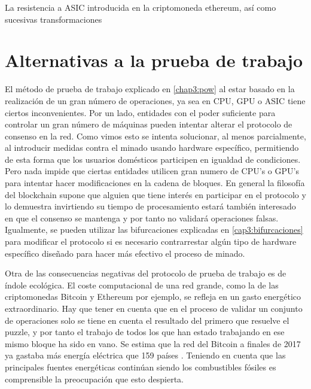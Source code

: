 La resistencia a ASIC introducida en la criptomoneda ethereum, así como sucesivas transformaciones 

\section{Alternativas a la prueba de trabajo}
El método de prueba de trabajo explicado en \ref{chap3:pow} al estar basado en la realización de un gran número de operaciones, ya sea en CPU, GPU o ASIC tiene ciertos inconvenientes. Por un lado, entidades con el poder suficiente para controlar un gran número de máquinas pueden intentar alterar el protocolo de consenso en la red. Como vimos esto se intenta solucionar, al menos parcialmente, al introducir medidas contra el minado usando hardware específico, permitiendo de esta forma que los usuarios domésticos participen en igualdad de condiciones. Pero nada impide que ciertas entidades utilicen gran numero de CPU's o GPU's para intentar hacer modificaciones en la cadena de bloques.
En general la filosofía del blockchain supone que alguien que tiene interés en participar en el protocolo y lo demuestra invirtiendo su tiempo de procesamiento estará también interesado en que el consenso se mantenga y por tanto no validará operaciones falsas. Igualmente, se pueden utilizar las bifurcaciones explicadas en \ref{cap3:bifurcaciones} para modificar el protocolo si es necesario contrarrestar algún tipo de hardware específico diseñado para hacer más efectivo el proceso de minado.

Otra de las consecuencias negativas del protocolo de prueba de trabajo es de índole ecológica. El coste computacional de una red grande, como la de las criptomonedas Bitcoin y Ethereum por ejemplo, se refleja en un gasto energético extraordinario. Hay que tener en cuenta que en el proceso de validar un conjunto de operaciones solo se tiene en cuenta el resultado del primero que resuelve el puzzle, y por tanto el trabajo de todos los que han estado trabajando en ese mismo bloque ha sido en vano. Se estima que la red del Bitcoin a finales de 2017 ya gastaba más energía eléctrica que 159 países \citep{electricidad}. Teniendo en cuenta que las principales fuentes energéticas continúan siendo los combustibles fósiles es comprensible la preocupación que esto despierta.

